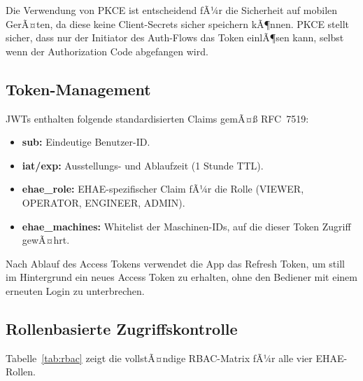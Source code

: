 ﻿\documentclass[12pt,a4paper]{article}
\begin{document}
Die Verwendung von PKCE \cite{rfc7636} ist entscheidend fÃ¼r die Sicherheit auf mobilen
GerÃ¤ten, da diese keine Client-Secrets sicher speichern kÃ¶nnen. PKCE stellt sicher, dass
nur der Initiator des Auth-Flows das Token einlÃ¶sen kann, selbst wenn der Authorization
Code abgefangen wird.

\subsection{Token-Management}

JWTs enthalten folgende standardisierten Claims gemÃ¤\ss{} RFC~7519:

\begin{itemize}[leftmargin=2em]
  \item \textbf{sub:} Eindeutige Benutzer-ID.
  \item \textbf{iat/exp:} Ausstellungs- und Ablaufzeit (1 Stunde TTL).
  \item \textbf{ehae\_role:} EHAE-spezifischer Claim fÃ¼r die Rolle (VIEWER, OPERATOR,
    ENGINEER, ADMIN).
  \item \textbf{ehae\_machines:} Whitelist der Maschinen-IDs, auf die dieser Token
    Zugriff gewÃ¤hrt.
\end{itemize}

Nach Ablauf des Access Tokens verwendet die App das Refresh Token, um still im
Hintergrund ein neues Access Token zu erhalten, ohne den Bediener mit einem erneuten
Login zu unterbrechen.

\subsection{Rollenbasierte Zugriffskontrolle}

Tabelle~\ref{tab:rbac} zeigt die vollstÃ¤ndige RBAC-Matrix fÃ¼r alle vier EHAE-Rollen.
\end{document}
